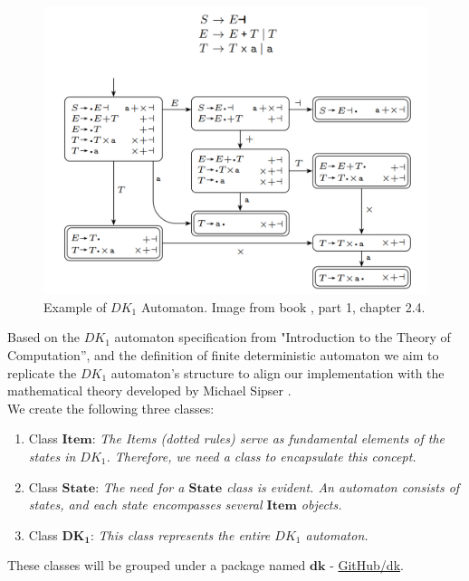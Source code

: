\begin{figure}[h!]
    \includegraphics[width=\linewidth]{DK1 example.png}
    \caption{Example of \(DK_{1}\) Automaton. Image from book \cite{sipser}, part 1, chapter 2.4.}
    \label{figure 3}
\end{figure}

Based on the \( DK_{1} \) automaton specification from "Introduction to the Theory of Computation”, and the definition of finite deterministic automaton we aim to replicate the \( DK_{1} \) automaton's structure to align our implementation with the mathematical theory developed by Michael Sipser \cite{sipser}.\\

We create the following three classes:
\begin{enumerate}
    \item Class \(\boldsymbol{Item}\): \textit{The Items (dotted rules) serve as fundamental elements of the states in \( DK_{1} \). Therefore, we need a class to encapsulate this concept.}
    \item Class \(\boldsymbol{State}\): \textit{The need for a \(\boldsymbol{State}\) class is evident. An automaton consists of states, and each state encompasses several \(\boldsymbol{Item}\) objects.}
    \item Class \(\boldsymbol{DK_{1}}\): \textit{This class represents the entire \( DK_{1} \) automaton.}
\end{enumerate}

These classes will be grouped under a package named \(\boldsymbol{dk}\) - \href{https://github.com/fyfsb/dcfg/tree/main/src/main/java/dk}{GitHub/dk}.\\

